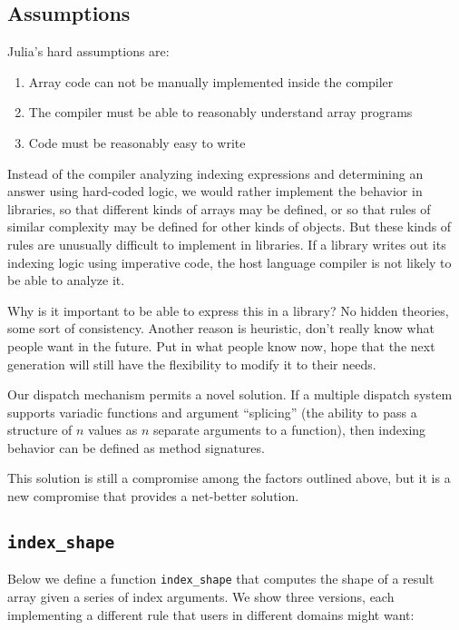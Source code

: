 \documentclass[preprint]{sigplanconf}
\begin{document}
\subsection{Assumptions}
Julia's hard assumptions are:

\begin{enumerate}
\item Array code can not be manually implemented inside the compiler
\item The compiler must be able to reasonably understand array programs
\item Code must be reasonably easy to write
\end{enumerate}

Instead of the compiler analyzing indexing expressions and determining an
answer using hard-coded logic, we would rather implement the behavior in
libraries, so that different kinds of arrays may be defined, or so that rules
of similar complexity may be defined for other kinds of objects. But these
kinds of rules are unusually difficult to implement in libraries. If a library
writes out its indexing logic using imperative code, the host language
compiler is not likely to be able to analyze it.

Why is it important to be able to express this in a library? No hidden
theories, some sort of consistency. Another reason is heuristic, don't really
know what people want in the future. Put in what people know now, hope that
the next generation will still have the flexibility to modify it to their
needs.

Our dispatch mechanism permits a novel solution. If a multiple dispatch system
supports variadic functions and argument ``splicing'' (the ability to pass a
structure of $n$ values as $n$ separate arguments to a function), then
indexing behavior can be defined as method signatures.

This solution is still a compromise among the factors outlined above, but it
is a new compromise that provides a net-better solution.


\subsection{\texttt{index\_shape}}

Below we define a function \texttt{index\_shape} that computes the shape of a
result array given a series of index arguments. We show three versions, each
implementing a different rule that users in different domains might want:
\end{document}
